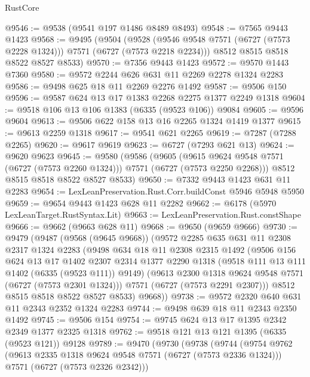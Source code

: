 \begin{lexlean}{RustCore}
\begin{coremodule}
@9546 := @9538 (@9541 @197 @1486 @8489 @8493)
@9548 := @7565 @9443 @1423
@9568 := @9495
    (@9504
      (@9528 (@9546 @9548 @7571 (@6727 (@7573 @2228 @1324))) @7571 (@6727 (@7573 @2218 @2234)))
      @8512
      @8515
      @8518
      @8522
      @8527
      @8533)
@9570 := @7356 @9443 @1423
@9572 := @9570 @1443 @7360
@9580 := @9572 @2244 @626 @631 @11 @2269 @2278 @1324 @2283
@9586 := @9498 @625 @18 @11 @2269 @2276 @1492
@9587 := @9506 @150
@9596 := @9587 @624 @13 @17 @1383 @2268 @2275 @1377 @2249 @1318
@9604 := @9518 @106 @13 @106 @1383 (@6335 (@9523 @106)) @9084
@9605 := @9596 @9604
@9613 := @9506 @622 @158 @13 @16 @2265 @1324 @1419 @1377
@9615 := @9613 @2259 @1318
@9617 := @9541 @621 @2265
@9619 := @7287 (@7288 @2265)
@9620 := @9617 @9619
@9623 := @6727 (@7293 @621 @13)
@9624 := @9620 @9623
@9645 := @9580
    (@9586
      (@9605
        (@9615 @9624 @9548 @7571 (@6727 (@7573 @2260 @1324)))
        @7571
        (@6727 (@7573 @2250 @2268)))
      @8512
      @8515
      @8518
      @8522
      @8527
      @8533)
@9650 := @7332 @9443 @1423 @631 @11 @2283
@9654 := LexLeanPreservation.Rust.Corr.buildConst @5946 @5948 @5950
@9659 := @9654 @9443 @1423 @628 @11 @2282
@9662 := @6178 (@5970 LexLeanTarget.RustSyntax.Lit)
@9663 := LexLeanPreservation.Rust.constShape
@9666 := @9662 (@9663 @628 @11)
@9668 := @9650 (@9659 @9666)
@9730 := @9479
    (@9487
      (@9568 (@9645 @9668))
      (@9572
        @2285
        @635
        @631
        @11
        @2308
        @2317
        @1324
        @2283
        (@9498
          @634
          @18
          @11
          @2308
          @2315
          @1492
          (@9506
            @156
            @624
            @13
            @17
            @1402
            @2307
            @2314
            @1377
            @2290
            @1318
            (@9518 @111 @13 @111 @1402 (@6335 (@9523 @111)) @9149)
            (@9613 @2300 @1318 @9624 @9548 @7571 (@6727 (@7573 @2301 @1324)))
            @7571
            (@6727 (@7573 @2291 @2307)))
          @8512
          @8515
          @8518
          @8522
          @8527
          @8533)
        @9668))
@9738 := @9572 @2320 @640 @631 @11 @2343 @2352 @1324 @2283
@9744 := @9498 @639 @18 @11 @2343 @2350 @1492
@9745 := @9506 @154
@9754 := @9745 @624 @13 @17 @1395 @2342 @2349 @1377 @2325 @1318
@9762 := @9518 @121 @13 @121 @1395 (@6335 (@9523 @121)) @9128
@9789 := @9470
    (@9730
      (@9738
        (@9744
          (@9754
            @9762
            (@9613 @2335 @1318 @9624 @9548 @7571 (@6727 (@7573 @2336 @1324)))
            @7571
            (@6727 (@7573 @2326 @2342)))

\end{coremodule}
\end{lexlean}
